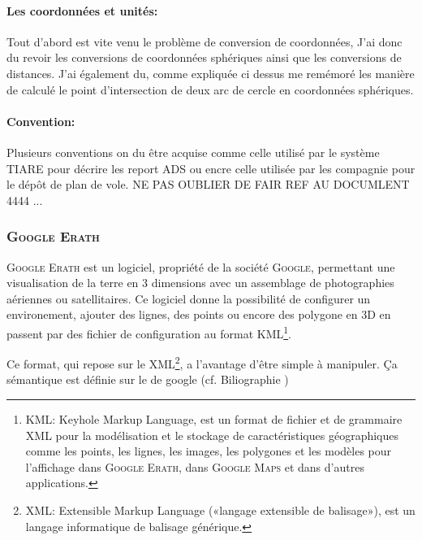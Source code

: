             \paragraph{Les coordonnées et unités:}
Tout d'abord est vite venu le problème de conversion de coordonnées, J'ai donc du revoir les conversions de coordonnées sphériques ainsi que les conversions de distances.
J'ai également du, comme expliquée ci dessus %
me remémoré les manière de calculé le point d'intersection de deux arc de cercle en coordonnées sphériques.

           \paragraph{Convention:}
Plusieurs conventions on du être acquise comme celle utilisé par le système TIARE pour décrire les report ADS ou encre celle utilisée par les compagnie pour le dépôt de plan de vole.
NE PAS OUBLIER DE FAIR REF AU DOCUMLENT 4444 ...

        \subsubsection{\textsc{Google Erath}}
\textsc{Google Erath} est un logiciel, propriété de la société \textsc{Google}, permettant une visualisation de la terre en 3 dimensions avec un assemblage de photographies aériennes ou satellitaires. Ce logiciel donne la possibilité de configurer un environement, ajouter des lignes, des points ou encore des polygone en 3D en passent par des fichier de configuration au format KML\footnote{KML: Keyhole Markup Language, est un format de fichier et de grammaire XML pour la modélisation et le stockage de caractéristiques géographiques comme les points, les lignes, les images, les polygones et les modèles pour l'affichage dans \textsc{Google Erath}, dans \textsc{Google Maps} et dans d'autres applications.}.

Ce format, qui repose sur le XML\footnote{XML: Extensible Markup Language («langage extensible de balisage»), est un langage informatique de balisage générique.}, a l'avantage d’être simple à manipuler. Ça sémantique est définie sur le de google (cf. Biliographie \cite{gecode}) 

